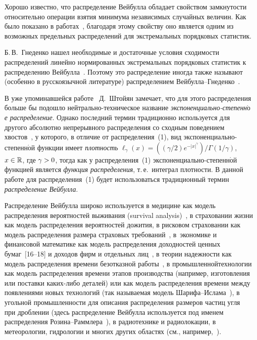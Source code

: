\begin{multicols}{2}
Хорошо известно, что распределение
Вейбулла обладает свойством замкнутости относительно операции взятия
минимума независимых случайных величин. Как было показано в
работах~\cite{Frechet1927, FisherTippett1928}, благодаря этому свойству оно
является одним из возможных предельных распределений для
экстремальных порядковых статистик. 

Б.\,В.~Гнеденко нашел необходимые
и достаточные условия сходимости распределений линейно нормированных
экстремальных порядковых статистик к распределению Вейбулла~\cite{Gnedenko1943}.
Поэтому это распределение иногда также называют
(особенно в русскоязычной литературе) распределением
Вей\-бул\-ла--Гне\-ден\-ко~\cite{JohnsonKotzBalakrishnan1994}.

В уже упоминавшейся работе~\cite{Stoyan2013} Д.~Штойян замечает, что
для этого распределения больше бы \mbox{подошло} нейт\-раль\-но-тех\-ни\-че\-ское
название {\it экс\-по\-нен\-ци\-а\-ль\-но-сте\-пен\-н$\acute{\mbox{о}}$е
распределение}. Однако
последний термин традиционно используется для другого абсолютно
непрерывного распределения со сходным поведением
хвостов~\cite{BoxTiao1973, GrigoryevaKorolev2013}, у которого, в отличие от
распределения~(1), вид экс\-по\-нен\-ци\-а\-ль\-но-сте\-пен\-н$\acute{\mbox{о}}$й
функции имеет {\it плотность}
$\ell_{\gamma}(x)=((\gamma/{2})e^{-|x|^{\gamma}})/\Gamma(1/\gamma)$,
$x\hm\in\mathbb{R}$, где $\gamma\hm>0$, тогда как у распределения~(1)
экс\-по\-нен\-ци\-а\-ль\-но-сте\-пен\-н$\acute{\mbox{о}}$й
функцией является {\it функция распределения}, т.\,е.\ интеграл плотности.
%
В данной работе для распределения~(1) будет использоваться
традиционный термин {\it распределение Вейбулла}.

Распределение Вейбулла широко используется в медицине как модель
распределения вероятностей выживания (survival analysis)~\cite{JohnsonJohnson1999},
в страховании жизни как модель
распределения вероятностей дожития, в рисковом страховании как
модель распределения размера страховых требований~\cite{HoggKlugman1983},
в~экономике и финансовой математике как
модель распределения доходностей ценных бумаг~[16--18] и доходов
фирм и отдельных лиц~\cite{Bartels1977, Bordleyetal1996}, в тео\-рии
надежности как модель распределения времени безотказной
работы~\cite{Lawless1982, Abernethy2004}, в промышленной\linebreak технологии как
модель распределения времени этапов производства (например,
изготовления или постав\-ки каких-либо деталей) или как модель
распределения времени между появлениями новых технологий (так
называемая модель Ша\-ри\-фа--Ис\-ла\-ма~\cite{SharifIslam1980}), в угольной
промышленности для описания распределения размеров частиц угля при
дроб\-ле\-нии (здесь распределение Вейбулла используется под именем
распределения Ро\-зи\-на--Рам\-мле\-ра~\cite{RosinRammler1933}), в
радиотехнике и радиолокации, в метеорологии, гидрологии и многих
других областях (см., например,~\cite{JohnsonKotzBalakrishnan1994,
Lawless1982, Abernethy2004, JohnsonKotz1970, KotzNadaraja2000}).


\end{multicols}

